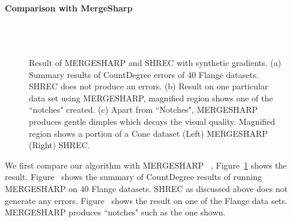 \paragraph{Comparison with MergeSharp}
\begin{figure}[htb]
	\centering
	\\
	\\
	\caption{Result of  MERGESHARP and SHREC with synthetic gradients. (a) Summary results of  CountDegree errors of 40 Flange datasets. SHREC does not produce an errors. (b) Result on one particular data set using MERGESHARP, magnified region shows one of the ``notches" created. (c) Apart from ``Notches", MERGESHARP produces gentle dimples which decays the visual quality. Magnified region shows a portion of a Cone dataset (Left) MERGESHARP (Right) SHREC. }
	\label{fig:mergeSharpVShrec}
\end{figure}	
We first compare our algorithm with MERGESHARP ~\cite{bw-cisec-13}, Figure~\ref{fig:mergeSharpVShrec} shows the result. Figure~\protect{} shows the summary of CountDegree results of running MERGESHARP on 40 Flange datasets. SHREC as discussed above does not generate any errors. Figure~\protect{} shows the result on one of the Flange data sets. MERGESHARP produces ``notches" such as the one shown. 

